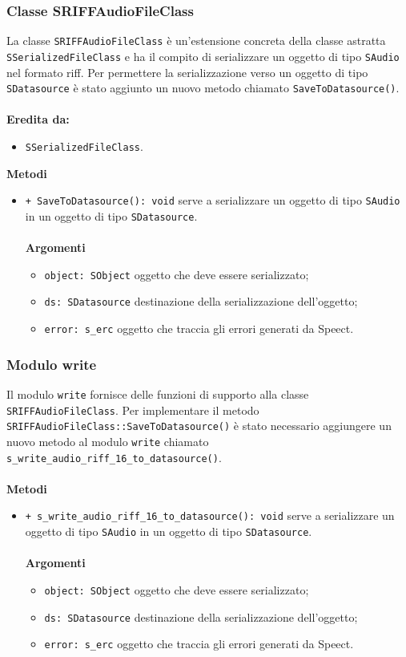 \subsubsection{Classe SRIFFAudioFileClass}
La classe \texttt{SRIFFAudioFileClass} è un'estensione concreta della classe astratta \texttt{SSerializedFileClass} e ha il compito di serializzare un oggetto di tipo \texttt{SAudio} nel formato riff.
Per permettere la serializzazione verso un oggetto di tipo \texttt{SDatasource} è stato aggiunto un nuovo metodo chiamato \texttt{SaveToDatasource()}.\\\\
\textbf{Eredita da:}
\begin{itemize}
	\item \texttt{SSerializedFileClass}.
\end{itemize}
\textbf{Metodi}
\begin{itemize}
	\item \texttt{+ SaveToDatasource(): void} serve a serializzare un oggetto di tipo \texttt{SAudio} in un oggetto di tipo \texttt{SDatasource}.\\\\
	\textbf{Argomenti}
	\begin{itemize}
		\item \texttt{object: SObject} oggetto che deve essere serializzato;
		\item \texttt{ds: SDatasource} destinazione della serializzazione dell'oggetto;
		\item \texttt{error: s\_erc} oggetto che traccia gli errori generati da Speect.
	\end{itemize}
\end{itemize}

\subsubsection{Modulo write}
Il modulo \texttt{write} fornisce delle funzioni di supporto alla classe \texttt{SRIFFAudioFileClass}. Per implementare il metodo \texttt{SRIFFAudioFileClass::SaveToDatasource()} è stato necessario aggiungere un nuovo metodo al modulo \texttt{write} chiamato \texttt{s\_write\_audio\_riff\_16\_to\_datasource()}.\\\\
\textbf{Metodi}
\begin{itemize}
	\item \texttt{+ s\_write\_audio\_riff\_16\_to\_datasource(): void} serve a serializzare un oggetto di tipo \texttt{SAudio} in un oggetto di tipo \texttt{SDatasource}.\\\\
	\textbf{Argomenti}
	\begin{itemize}
		\item \texttt{object: SObject} oggetto che deve essere serializzato;
		\item \texttt{ds: SDatasource} destinazione della serializzazione dell'oggetto;
		\item \texttt{error: s\_erc} oggetto che traccia gli errori generati da Speect.
	\end{itemize}
\end{itemize}

